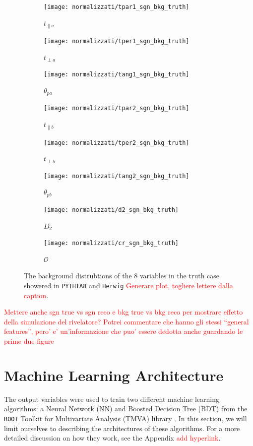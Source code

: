 \documentclass[10pt,a4paper]{book}
\newcommand\todo[1]{\textcolor{red}{#1}}
\def\code#1{\texttt{#1}}
\begin{document}
\begin{figure}
\begin{subfigure}{.33\textwidth}
\centering
\texttt{[image: normalizzati/tpar1\_sgn\_bkg\_truth]}
\caption{$t_{\parallel a}$}
\end{subfigure}
\begin{subfigure}{0.33\textwidth}
\centering
\texttt{[image: normalizzati/tper1\_sgn\_bkg\_truth]}
\caption{$t_{\perp a}$}
\end{subfigure}
\begin{subfigure}{.33\textwidth}
\centering
\texttt{[image: normalizzati/tang1\_sgn\_bkg\_truth]}
\caption{$\theta_{pa}$}
\end{subfigure}
\begin{subfigure}{.33\textwidth}
\centering
\texttt{[image: normalizzati/tpar2\_sgn\_bkg\_truth]}
\caption{$t_{\parallel b}$}
\end{subfigure}
\begin{subfigure}{0.33\textwidth}
\centering
\texttt{[image: normalizzati/tper2\_sgn\_bkg\_truth]}
\caption{$t_{\perp b}$}
\end{subfigure}
\begin{subfigure}{.33\textwidth}
\centering
\texttt{[image: normalizzati/tang2\_sgn\_bkg\_truth]}
\caption{$\theta_{pb}$}
\end{subfigure}
\begin{subfigure}{0.5\textwidth}
\centering
\texttt{[image: normalizzati/d2\_sgn\_bkg\_truth]}
\caption{$D_2$}
\end{subfigure}
\begin{subfigure}{.5\textwidth}
\centering
\texttt{[image: normalizzati/cr\_sgn\_bkg\_truth]}
\caption{$\mathcal{O}$}
\end{subfigure}
\caption{The background distrubtions of the 8 variables in the truth case showered in \code{PYTHIA8} and \code{Herwig} \todo{Generare plot, togliere lettere dalla caption}.}
\label{pythia herwig bkg}
\end{figure}

\todo{Mettere anche sgn true vs sgn reco e bkg true vs bkg reco per mostrare effetto della simulazione del rivelatore? Potrei commentare che hanno gli stessi ``general features'', pero' e' un'informazione che puo' essere dedotta anche guardando le prime due figure}


\section{Machine Learning Architecture}
The output variables were used to train two different machine learning algorithms: a Neural Network (NN) and Boosted Decision Tree (BDT) from the \code{ROOT} Toolkit for Multivariate Analysis (TMVA) library \cite{TMVA}. In this section, we will limit ourselves to describing the architectures of these algorithms. For a more detailed discussion on how they work, see the Appendix \todo{add hyperlink}. 
\end{document}
